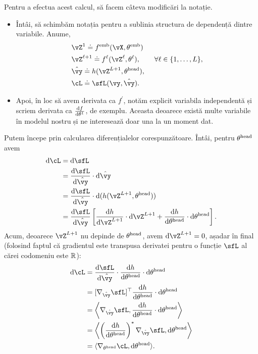 \documentclass[../../book-main_ro.tex]{subfiles}
\begin{document}
Pentru a efectua acest calcul, să facem câteva modificări la notație. 
\begin{itemize}
    \item Întâi, să schimbăm notația pentru a sublinia structura de dependență dintre variabile. Anume, 
    \begin{align}
        &\vZ^{1} \doteq f^{\emb}(\vX, \theta^{\emb}) \\ 
        &\vZ^{\ell + 1} \doteq f^{\ell}(\vZ^{\ell}, \theta^{\ell}), \qquad \forall \ell \in \{1, \dots, L\}, \\
        &\hat{\vy} \doteq h(\vZ^{L+1}, \theta^{\head}), \\ 
        &\cL \doteq \sfL(\vy, \hat{\vy}).
    \end{align}
    \item Apoi, în loc să avem derivata ca \(f^{\prime}\), notăm explicit variabila independentă și scriem derivata ca \(\odv{f}{\theta^{1}}\), de exemplu. Aceasta deoarece există multe variabile în modelul nostru și ne interesează doar una la un moment dat.
\end{itemize}
Putem începe prin calcularea diferențialelor corespunzătoare. Întâi, pentru \(\theta^{\mathrm{head}}\) avem
\begin{align}
    \odif{\cL}
    &= \odif{\sfL} \\ 
    &= \odv{\sfL}{\hat{\vy}}\cdot\odif{\hat{\vy}} \\ 
    &= \odv{\sfL}{\hat{\vy}}\cdot\odif{{(h(\vZ^{L + 1}, \theta^{\head}))}} \\ 
    &= \odv{\sfL}{\hat{\vy}}\bs{\odv{h}{\vZ^{L + 1}}\cdot\odif{\vZ}^{L + 1} + \odv{h}{\theta^{\head}}\cdot\odif{\theta}^{\head}}.
\end{align}
Acum, deoarece \(\vZ^{L + 1}\) nu depinde de \(\theta^{\mathrm{head}}\), avem \(\odif{\vZ}^{L + 1} = 0\), așadar în final (folosind faptul că gradientul este transpusa derivatei pentru o funcție \(\sfL\) al cărei codomeniu este \(\mathbb{R}\)):
\begin{align}
    \odif{\cL} 
    &= \odv{\sfL}{\hat{\vy}}\cdot\odv{h}{\theta^{\head}}\cdot\odif{\theta}^{\head} \\ 
    &= [\nabla_{\hat{\vy}}\sfL]^{\top}\odv{h}{\theta^{\head}}\cdot\odif{\theta}^{\head} \\ 
    &= \ip*{\nabla_{\hat{\vy}}\sfL}{\odv{h}{\theta^{\head}}\cdot\odif{\theta}^{\head}} \\
    &= \ip*{\bp{\odv{h}{\theta^{\head}}}^{*}\nabla_{\hat{\vy}}\sfL}{\odif{\theta}^{\head}} \\ 
    &= \ip{\nabla_{\theta^{\head}}\cL}{\odif{\theta}^{\head}}.
\end{align}
\end{document}
